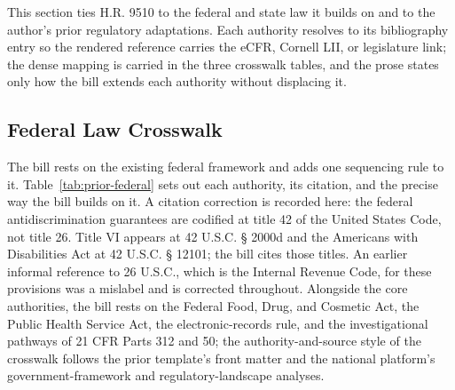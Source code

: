 
This section ties H.R. 9510 to the federal and state law it builds on and to the
author's prior regulatory adaptations. Each authority resolves to its
bibliography entry so the rendered reference carries the eCFR, Cornell LII, or
legislature link; the dense mapping is carried in the three crosswalk tables, and
the prose states only how the bill extends each authority without displacing it.

\subsection{Federal Law Crosswalk}

The bill rests on the existing federal framework and adds one sequencing rule to
it. Table~\ref{tab:prior-federal} sets out each authority, its citation, and the
precise way the bill builds on it. A citation correction is recorded here: the
federal antidiscrimination guarantees are codified at title 42 of the United
States Code, not title 26. Title VI appears at 42 U.S.C. § 2000d and the
Americans with Disabilities Act at 42 U.S.C. § 12101; the bill cites those titles.
An earlier informal reference to 26 U.S.C., which is the Internal Revenue Code,
for these provisions was a mislabel and is corrected throughout. Alongside the
core authorities, the bill rests on the Federal Food, Drug, and Cosmetic Act, the
Public Health Service Act, the electronic-records rule, and the investigational
pathways of 21 CFR Parts 312 and 50; the authority-and-source style of the
crosswalk follows the prior template's front matter and the national platform's
government-framework and regulatory-landscape analyses.

